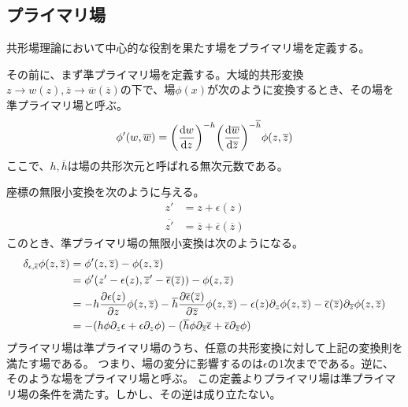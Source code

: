 \documentclass[11pt, dvipdfmx]{article}
\numberwithin{equation}{section}
\newcommand{\blankline}{\par\vspace{\baselineskip}} %
\begin{document}
\subsection{プライマリ場}
共形場理論において中心的な役割を果たす場をプライマリ場を定義する。
\blankline
その前に、まず準プライマリ場を定義する。大域的共形変換$z\rightarrow w(z),\overline{z}\rightarrow \overline{w}(\overline{z})$の下で、場$\phi(x)$が次のように変換するとき、その場を準プライマリ場と呼ぶ。
\begin{align}
    \phi'(w,\overline{w})=\qty(\dv{w}{z})^{-h}\qty(\dv{\overline{w}}{\overline{z}})^{-\overline{h}}\phi(z,\overline{z})
\end{align}
ここで、$h,\overline{h}$は場の共形次元と呼ばれる無次元数である。
\blankline
座標の無限小変換を次のように与える。
\begin{align}
    z'&=z+\epsilon(z)\\
    \overline{z'}&=\overline{z}+\overline{\epsilon}(\overline{z})
\end{align}
このとき、準プライマリ場の無限小変換は次のようになる。
\begin{align}
    \delta_{\epsilon,\overline{\epsilon}} \phi(z,\overline{z}) &= \phi'(z,\overline{z}) - \phi(z,\overline{z})\\
    &= \phi'(z'-\epsilon(z),\overline{z}'-\overline{\epsilon}(\overline{z}) ) - \phi(z,\overline{z})\\
    &= -h\pdv{\epsilon(z)}{z}\phi(z,\overline{z}) - \overline{h}\pdv{\overline{\epsilon}(\overline{z})}{\overline{z}}\phi(z,\overline{z}) - \epsilon(z)\partial_z \phi(z,\overline{z}) - \overline{\epsilon}(\overline{z})\partial_{\overline{z}} \phi(z,\overline{z})\\
    &=-(h\phi \partial_z \epsilon + \epsilon \partial_z \phi) - (\overline{h}\phi \partial_{\overline{z}} \overline{\epsilon} + \overline{\epsilon} \partial_{\overline{z}} \phi)\label{primary variation}
\end{align}
プライマリ場は準プライマリ場のうち、任意の共形変換に対して上記の変換則を満たす場である。
つまり、場の変分に影響するのは$\epsilon$の1次までである。逆に、そのような場をプライマリ場と呼ぶ。
この定義よりプライマリ場は準プライマリ場の条件を満たす。しかし、その逆は成り立たない。
\blankline
\end{document}
